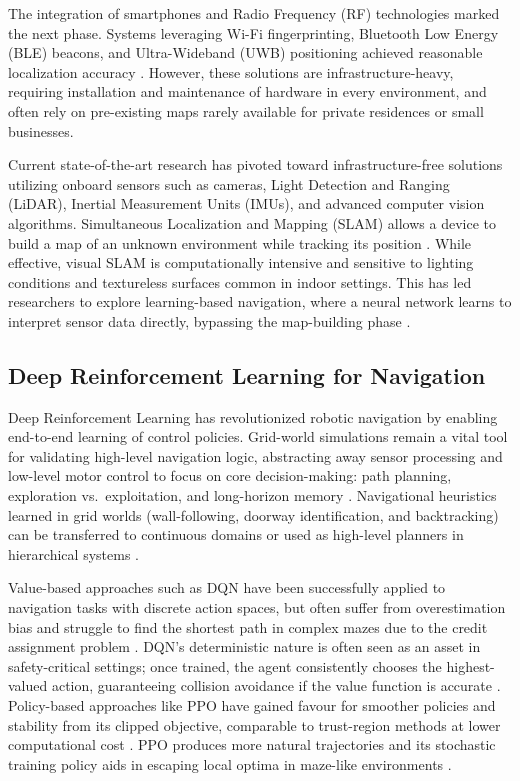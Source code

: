\documentclass{article}
\begin{document}
The integration of smartphones and Radio Frequency (RF) technologies marked the
next phase. Systems leveraging Wi-Fi fingerprinting, Bluetooth Low Energy (BLE)
beacons, and Ultra-Wideband (UWB) positioning achieved reasonable localization
accuracy \cite{mahida2020}. However, these solutions are infrastructure-heavy,
requiring installation and maintenance of hardware in every environment, and often
rely on pre-existing maps rarely available for private residences or small
businesses.

Current state-of-the-art research has pivoted toward infrastructure-free
solutions utilizing onboard sensors such as cameras, Light Detection and Ranging
(LiDAR), Inertial Measurement Units (IMUs), and advanced computer vision
algorithms. Simultaneous Localization and Mapping (SLAM) allows a device to build
a map of an unknown environment while tracking its position \cite{lu2021}. While
effective, visual SLAM is computationally intensive and sensitive to lighting
conditions and textureless surfaces common in indoor settings. This has led
researchers to explore learning-based navigation, where a neural network learns to
interpret sensor data directly, bypassing the map-building phase \cite{arce2023}.

\subsection{Deep Reinforcement Learning for Navigation}

Deep Reinforcement Learning has revolutionized robotic navigation by enabling
end-to-end learning of control policies. Grid-world simulations remain a vital
tool for validating high-level navigation logic, abstracting away sensor
processing and low-level motor control to focus on core decision-making: path
planning, exploration vs.\ exploitation, and long-horizon memory \cite{pujar2025}.
Navigational heuristics learned in grid worlds (wall-following, doorway
identification, and backtracking) can be transferred to continuous domains or
used as high-level planners in hierarchical systems \cite{macglashan2009}.

Value-based approaches such as DQN have been successfully applied to navigation
tasks with discrete action spaces, but often suffer from overestimation bias and
struggle to find the shortest path in complex mazes due to the credit assignment
problem \cite{arce2023}. DQN's deterministic nature is often seen as an asset in
safety-critical settings; once trained, the agent consistently chooses the
highest-valued action, guaranteeing collision avoidance if the value function is
accurate \cite{zhu2025}. Policy-based approaches like PPO have gained favour for
smoother policies and stability from its clipped objective, comparable to
trust-region methods at lower computational cost \cite{verstraete2024}. PPO
produces more natural trajectories and its stochastic training policy aids in
escaping local optima in maze-like environments \cite{tan2025}.
\end{document}
